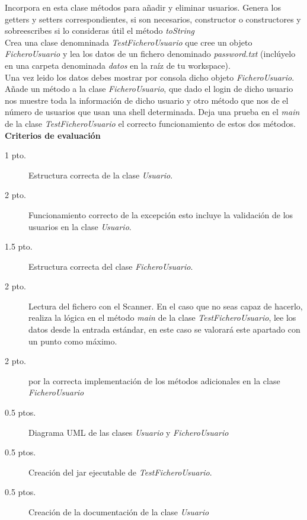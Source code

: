 \documentclass[addpoints,12pt]{exam}
\begin{document}
\begin{questions}
\begin{itemize}
\end{itemize}
Incorpora en esta clase métodos para añadir y eliminar usuarios. Genera los getters y setters correspondientes, si son necesarios, constructor o constructores y sobreescribes si lo consideras útil el método \emph{toString} 
\vspace{0.3cm}
\\
Crea una clase denomninada \emph{TestFicheroUsuario} que cree un objeto \emph{FicheroUsuario} y lea los datos de un fichero denominado \emph{password.txt} (inclúyelo en una carpeta denominada \emph{datos} en la raíz de tu workspace).
\vspace{0.3cm}
\\
Una vez leido los datos debes mostrar por consola dicho objeto \emph{FicheroUsuario}.
\vspace{0.3cm}
\\
Añade un método a la clase \emph{FicheroUsuario}, que dado el login de dicho usuario nos muestre toda la información de dicho usuario y otro método que nos de el número de usuarios que usan una shell determinada. Deja una prueba en el \emph{main} de la clase \emph{TestFicheroUsuario} el correcto funcionamiento de estos dos métodos.
\vspace{0.3cm}\\

\textbf{Criterios de evaluación}
\begin{description}
\item[1 pto.] Estructura correcta de la clase \emph{Usuario}.
\item[2 pto.] Funcionamiento correcto de la excepción esto incluye la validación de los usuarios en la clase \emph{Usuario}.
\item[1.5 pto.] Estructura correcta del clase \emph{FicheroUsuario}.
\item[2 pto.] Lectura del fichero con el Scanner. En el caso que no seas capaz de hacerlo, realiza la lógica en el método \emph{main} de la clase \emph{TestFicheroUsuario}, lee los datos desde la entrada estándar, en este caso se valorará este apartado con un punto como máximo.
\item[2 pto.] por la correcta implementación de los métodos adicionales en la clase \emph{FicheroUsuario}
\item[0.5 ptos.] Diagrama UML de las clases \emph{Usuario} y \emph{FicheroUsuario} 
\item[0.5 ptos.] Creación del jar ejecutable de \emph{TestFicheroUsuario}.
\item[0.5 ptos.] Creación de la documentación de la clase \emph{Usuario} 
\end{description}
\end{questions}
\end{document}
